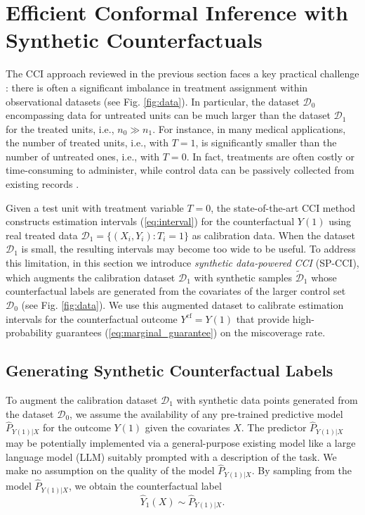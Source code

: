 \documentclass{article}
\theoremstyle{plain}
\theoremstyle{definition}
\theoremstyle{remark}
\begin{document}
\section{Efficient Conformal Inference with Synthetic Counterfactuals}
\label{sec:method}

The CCI approach reviewed in the previous section faces a key practical challenge \citep{shalit2017estimating}: there is often a significant imbalance in treatment assignment within observational datasets (see Fig. \ref{fig:data}). In particular, the dataset $\mathcal{D}_0$ encompassing data for untreated units can be much larger than the dataset $\mathcal{D}_1$ for the treated units, i.e., $n_0 \gg n_1$. For instance, in many medical applications, the number of treated units, i.e., with $T = 1$, is significantly smaller than the number of untreated ones, i.e., with $T = 0$. In fact, treatments are often costly or time-consuming to administer, while control data can be passively collected from existing records \citep{ballinari2024calibrating}.

Given a test unit with treatment variable $T = 0$, the state-of-the-art CCI method constructs estimation intervals (\ref{eq:interval}) for the counterfactual $Y(1)$ using real treated data $\mathcal{D}_1 = \{(X_i, Y_i): T_i = 1\}$ as calibration data. When the dataset $\mathcal{D}_1$ is small, the resulting intervals may become too wide to be useful. To address this limitation, in this section we introduce \textit{synthetic data-powered CCI} (SP-CCI), which augments the calibration dataset $\mathcal{D}_1$ with synthetic samples $\tilde{\mathcal{D}}_1$ whose counterfactual labels are generated from the covariates of the larger control set $\mathcal{D}_0$ (see Fig. \ref{fig:data}). We use this augmented dataset to calibrate estimation intervals for the counterfactual outcome $Y^\text{cf} = Y(1)$ that provide high-probability guarantees (\ref{eq:marginal_guarantee}) on the miscoverage rate.


\subsection{Generating Synthetic Counterfactual Labels}

To augment the calibration dataset $\mathcal{D}_1$ with synthetic data points generated from the dataset $\mathcal{D}_0$, we assume the availability of any pre-trained predictive model $\hat{P}_{Y(1)|X}$ for the outcome $Y(1)$ given the covariates $X$. The predictor $\hat{P}_{Y(1)|X}$ may be potentially implemented via a general-purpose existing model like a large language model (LLM) suitably prompted with a description of the task. We make no assumption on the quality of the model $\hat{P}_{Y(1)|X}$. By sampling from the model \( \hat{P}_{Y(1)|X}\), we obtain the counterfactual label
\begin{equation}
\hat{Y}_1(X) \sim \hat{P}_{Y(1)|X}.
\end{equation}
\end{document}

